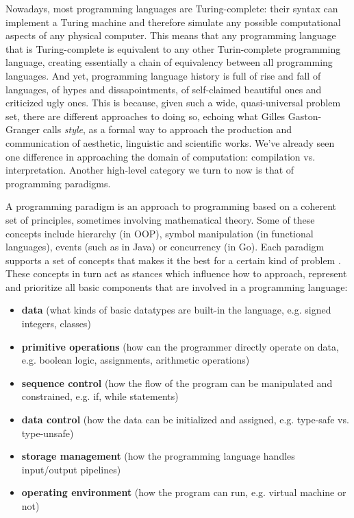 Nowadays, most programming languages are Turing-complete: their syntax can implement a Turing machine and therefore simulate any possible computational aspects of any physical computer. This means that any programming language that is Turing-complete is equivalent to any other Turin-complete programming language, creating essentially a chain of equivalency between all programming languages. And yet, programming language history is full of rise and fall of languages, of hypes and dissapointments, of self-claimed beautiful ones and criticized ugly ones. This is because, given such a wide, quasi-universal problem set, there are different approaches to doing so, echoing what Gilles Gaston-Granger calls \emph{style}, as a formal way to approach the production and communication of aesthetic, linguistic and scientific works\citep{granger_essai_1988}. We've already seen one difference in approaching the domain of computation: compilation vs. interpretation. Another high-level category we turn to now is that of programming paradigms.

A programming paradigm is an approach to programming based on a coherent set of principles, sometimes involving mathematical theory. Some of these concepts include hierarchy (in OOP), symbol manipulation (in functional languages), events (such as in Java) or concurrency (in Go). Each paradigm supports a set of concepts that makes it the best for a certain kind of problem \citep{vanroy_programming_2012}. These concepts in turn act as stances which influence how to approach, represent and prioritize all basic components that are involved in a programming language:

\begin{itemize}
  \item \textbf{data} (what kinds of basic datatypes are built-in the language, e.g. signed integers, classes)
  \item \textbf{primitive operations} (how can the programmer directly operate on data, e.g. boolean logic, assignments, arithmetic operations)
  \item \textbf{sequence control} (how the flow of the program can be manipulated and constrained, e.g. if, while statements)
  \item \textbf{data control} (how the data can be initialized and assigned, e.g. type-safe vs. type-unsafe)
  \item \textbf{storage management} (how the programming language handles input/output pipelines)
  \item \textbf{operating environment} (how the program can run, e.g. virtual machine or not)
\end{itemize}

